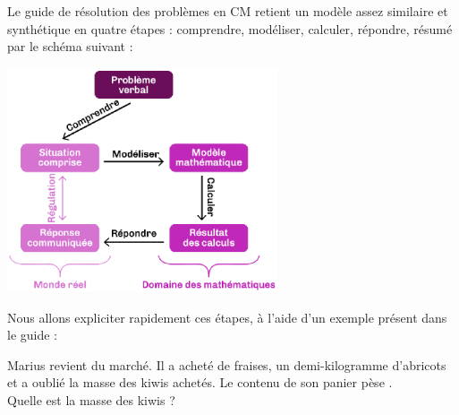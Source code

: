 Le guide de résolution des problèmes en CM retient un modèle assez similaire et synthétique en quatre étapes : comprendre, modéliser, calculer, répondre, résumé par le schéma suivant :
   \begin{center}
      \includegraphics[width=8cm]{Nombres_et_calculs_did/Images/Num2_cours_etapes}
   \end{center}

Nous allons expliciter rapidement ces étapes, à l'aide d'un exemple présent dans le guide :
\begin{exemple*1}
   Marius revient du marché. Il a acheté  de fraises, un demi-kilogramme d’abricots et a oublié la masse des kiwis achetés. Le contenu de son panier pèse . \\
   Quelle est la masse des kiwis ?
\end{exemple*1}

